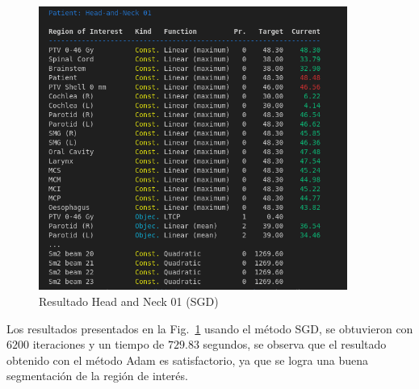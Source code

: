 \documentclass[a4paper,12pt]{article}
\begin{document}
\begin{figure}[!ht]
    \centering
    \includegraphics[width=0.9\textwidth]{result_sgd01.png}
    \caption{Resultado Head and Neck 01 (SGD)}
    \label{fig:result_sgd}
  \end{figure}
\newpage
Los resultados presentados en la Fig.~\ref{fig:result_sgd} usando el método SGD, se obtuvieron con $6200$ iteraciones y un tiempo de $729.83$ segundos, se observa que el resultado obtenido con el método Adam es satisfactorio, ya que se logra una buena segmentación de la región de interés.
\end{document}
